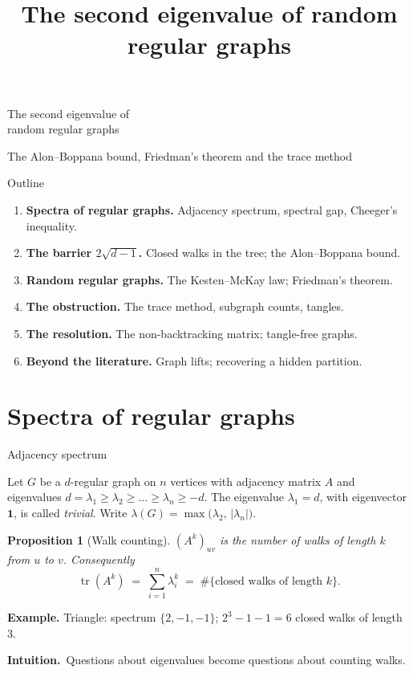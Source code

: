 \documentclass[aspectratio=169,10pt]{beamer}
\title{The second eigenvalue of random regular graphs}
\author{}
\date{}
\newtheorem{proposition}[theorem]{Proposition}
\DeclareMathOperator{\tr}{tr}
\newcommand{\edge}{2\sqrt{d-1}}
\newcommand{\one}{\mathbf{1}}
\newcommand{\intuition}{{\color{accent}\textbf{Intuition.}}\ }
\begin{document}
\begin{frame}[plain]
  \vfill
  { The second eigenvalue of\\[1mm] random regular graphs\par}
  \vspace{8mm}
  {\color{black!60} The Alon--Boppana bound, Friedman's theorem and the trace method\par}
  \vfill
\end{frame}

\begin{frame}{Outline}
  \begin{enumerate}
    \setlength{\itemsep}{2.5mm}
    \item \textbf{Spectra of regular graphs.} Adjacency spectrum, spectral gap, Cheeger's inequality.
    \item \textbf{The barrier $\edge$.} Closed walks in the tree; the Alon--Boppana bound.
    \item \textbf{Random regular graphs.} The Kesten--McKay law; Friedman's theorem.
    \item \textbf{The obstruction.} The trace method, subgraph counts, tangles.
    \item \textbf{The resolution.} The non-backtracking matrix; tangle-free graphs.
    \item \textbf{Beyond the literature.} Graph lifts; recovering a hidden partition.
  \end{enumerate}
\end{frame}

\section{Spectra of regular graphs}

\begin{frame}{Adjacency spectrum}
  \begin{definition}
    Let $G$ be a $d$-regular graph on $n$ vertices with adjacency matrix $A$ and eigenvalues
    $d=\lambda_1\ge\lambda_2\ge\dots\ge\lambda_n\ge-d$. The eigenvalue $\lambda_1=d$, with
    eigenvector $\one$, is called \emph{trivial}. Write
    $\lambda(G)=\max\bigl(\lambda_2,\,|\lambda_n|\bigr)$.
  \end{definition}
  \begin{proposition}[Walk counting]
    $(A^k)_{uv}$ is the number of walks of length $k$ from $u$ to $v$. Consequently
    \[
      \tr(A^k)\;=\;\sum_{i=1}^{n}\lambda_i^{k}\;=\;\#\{\text{closed walks of length }k\}.
    \]
    \vspace{-5mm}
  \end{proposition}
  \textbf{Example.} Triangle: spectrum $\{2,-1,-1\}$;\; $2^3-1-1=6$ closed walks of length $3$.

  \intuition Questions about eigenvalues become questions about counting walks.
\end{frame}
\end{document}
